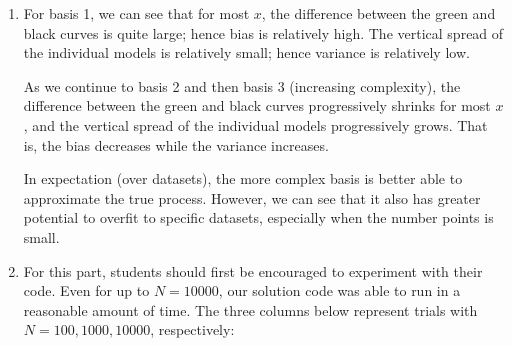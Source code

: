 \documentclass[submit]{harvardml}
\begin{document}
\begin{enumerate}
            \item

            For basis 1, we can see that for most $x$, the difference between the green
            and black curves is quite large; hence bias is relatively high. The vertical
            spread of the individual models is relatively small; hence variance is relatively low.

            As we continue to basis 2 and then basis 3 (increasing complexity), the difference between the green
            and black curves progressively shrinks for most $x$, and the vertical spread
            of the individual models progressively grows. That is, the bias decreases while the variance increases.

            In expectation (over datasets), the more complex basis is better able to approximate the true process.
            However, we can see that it also has greater potential to overfit to specific datasets, especially when
            the number points is small.

            \item

            For this part, students should first be encouraged to experiment
            with their code. Even for up to $N = 10000$, our solution code was
            able to run in a reasonable amount of time. The three columns below
            represent trials with $N = 100, 1000, 10000$, respectively:


\end{enumerate}
\end{document}
